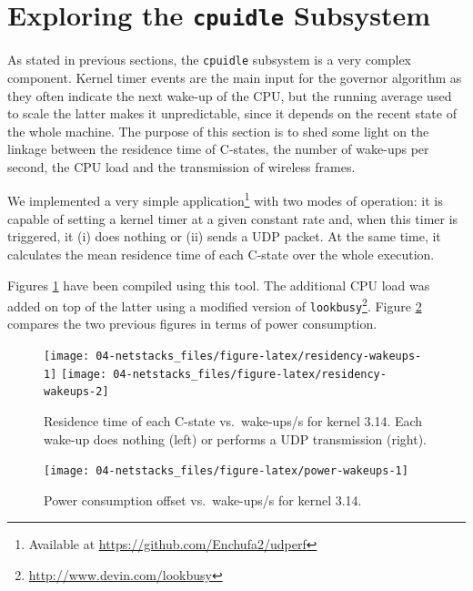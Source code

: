 \documentclass[twoside,nohyper]{tufte-book}
\begin{document}
\hypertarget{exploring-the-cpuidle-subsystem}{%
\section{\texorpdfstring{Exploring the \texttt{cpuidle} Subsystem}{Exploring the cpuidle Subsystem}}\label{exploring-the-cpuidle-subsystem}}

As stated in previous sections, the \texttt{cpuidle} subsystem is a very complex component. Kernel timer events are the main input for the governor algorithm as they often indicate the next wake-up of the CPU, but the running average used to scale the latter makes it unpredictable, since it depends on the recent state of the whole machine. The purpose of this section is to shed some light on the linkage between the residence time of C-states, the number of wake-ups per second, the CPU load and the transmission of wireless frames.

We implemented a very simple application\footnote{Available at \url{https://github.com/Enchufa2/udperf}} with two modes of operation: it is capable of setting a kernel timer at a given constant rate and, when this timer is triggered, it (i) does nothing or (ii) sends a UDP packet. At the same time, it calculates the mean residence time of each C-state over the whole execution.

Figures \ref{fig:residency-wakeups} have been compiled using this tool. The additional CPU load was added on top of the latter using a modified version of \texttt{lookbusy}\footnote{\url{http://www.devin.com/lookbusy}}. Figure \ref{fig:power-wakeups} compares the two previous figures in terms of power consumption.



\begin{figure}

{\centering \texttt{[image: 04-netstacks\_files/figure-latex/residency-wakeups-1]} \texttt{[image: 04-netstacks\_files/figure-latex/residency-wakeups-2]} 

}

\caption[Residence time of each C-state vs.~wake-ups/s for kernel 3.14. Each wake-up does nothing (left) or performs a UDP transmission (right).]{Residence time of each C-state vs.~wake-ups/s for kernel 3.14. Each wake-up does nothing (left) or performs a UDP transmission (right).}\label{fig:residency-wakeups}
\end{figure}



\begin{figure}

{\centering \texttt{[image: 04-netstacks\_files/figure-latex/power-wakeups-1]} 

}

\caption[Power consumption offset vs.~wake-ups/s for kernel 3.14.]{Power consumption offset vs.~wake-ups/s for kernel 3.14.}\label{fig:power-wakeups}
\end{figure}
\end{document}
